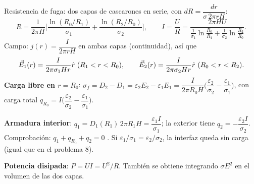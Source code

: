 Resistencia de fuga: dos capas de cascarones en serie, con $dR=\dfrac{dr}{\sigma\,2\pi rH}$:
\[
R=\frac{1}{2\pi H}\Big[\frac{\ln(R_0/R_1)}{\sigma_1}+\frac{\ln(R_2/R_0)}{\sigma_2}\Big],\qquad\boxed{I=\frac UR=\frac{2\pi HU}{\frac{1}{\sigma_1}\ln\frac{R_0}{R_1}+\frac{1}{\sigma_2}\ln\frac{R_2}{R_0}}}.
\]
Campo: $j(r)=\dfrac{I}{2\pi rH}$ en ambas capas (continuidad), así que
\[
\vE_1(r)=\frac{I}{2\pi\sigma_1Hr}\hat r\ (R_1<r<R_0),\qquad\vE_2(r)=\frac{I}{2\pi\sigma_2Hr}\hat r\ (R_0<r<R_2).
\]
\textbf{Carga libre en $r=R_0$}: $\sigma_f=D_2-D_1=\varepsilon_2E_2-\varepsilon_1E_1=\boxed{\dfrac{I}{2\pi R_0H}\Big(\dfrac{\varepsilon_2}{\sigma_2}-\dfrac{\varepsilon_1}{\sigma_1}\Big)}$, con carga total $q_{R_0}=I\Big(\dfrac{\varepsilon_2}{\sigma_2}-\dfrac{\varepsilon_1}{\sigma_1}\Big)$.

\textbf{Armadura interior}: $q_1=D_1(R_1)\,2\pi R_1H=\boxed{\dfrac{\varepsilon_1I}{\sigma_1}}$; la exterior tiene $q_2=-\dfrac{\varepsilon_2I}{\sigma_2}$. Comprobación: $q_1+q_{R_0}+q_2=0$ \checkmark. Si $\varepsilon_1/\sigma_1=\varepsilon_2/\sigma_2$, la interfaz queda sin carga (igual que en el problema 8).

\textbf{Potencia disipada}: $P=UI=\boxed{U^2/R}$. También se obtiene integrando $\sigma E^2$ en el volumen de las dos capas.
